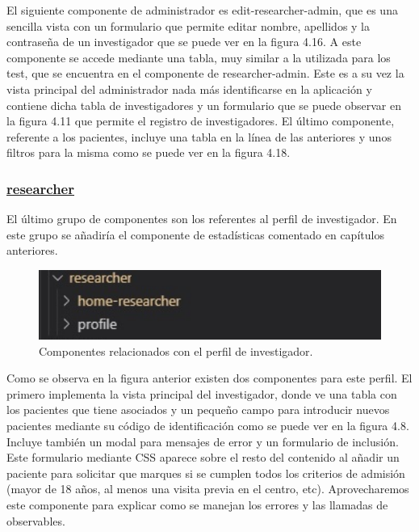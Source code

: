     El siguiente componente de administrador es edit-researcher-admin, que es una sencilla vista con un formulario que permite editar nombre, apellidos y la contraseña de un investigador que se puede ver en la figura 4.16. A este componente se accede mediante una tabla, muy similar a la utilizada para los test, que se encuentra en el componente de researcher-admin. Este es a su vez la vista principal del administrador nada más identificarse en la aplicación y contiene dicha tabla de investigadores y un formulario que se puede observar en la figura 4.11 que permite el registro de investigadores. El último componente, referente a los pacientes, incluye una tabla en la  línea de las anteriores y unos filtros para la misma como se puede ver en la figura 4.18.\newpage
    
    \subsubsection{\underline{researcher}}
    
    El último grupo de componentes son los referentes al perfil de investigador. En este grupo se añadiría el componente de estadísticas comentado en capítulos anteriores.
    
    \begin{figure}[h]
    \centering
    \includegraphics[width=1\textwidth]{images/researcherComponent.jpg}
    \caption{Componentes relacionados con el perfil de investigador.}
    \end{figure}
    \FloatBarrier
    
    Como se observa en la figura anterior existen dos componentes para este perfil. El primero implementa la vista principal del investigador, donde ve una tabla con los pacientes que tiene asociados y un pequeño campo para introducir nuevos pacientes mediante su código de identificación como se puede ver en la figura 4.8. Incluye también un modal para mensajes de error y un formulario de inclusión. Este formulario mediante CSS aparece sobre el resto del contenido al añadir un paciente para solicitar que marques si se cumplen todos los criterios de admisión (mayor de 18 años, al menos una visita previa en el centro, etc). Aprovecharemos este componente para explicar como se manejan los errores y las llamadas de observables.
    
